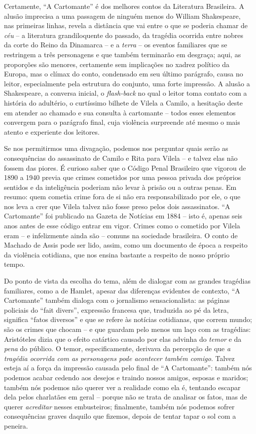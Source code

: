 \documentclass{extarticle}
\begin{document}
Certamente, ``A Cartomante'' é dos melhores contos da Literatura
Brasileira. A alusão imprecisa a uma passagem de ninguém menos do
William Shakespeare, nas primeiras linhas, revela a distância que vai
entre o que se poderia chamar de \emph{céu} -- a literatura
grandiloquente do passado, da tragédia ocorrida entre nobres da corte do
Reino da Dinamarca -- e a \emph{terra} -- os eventos familiares que se
restringem a três personagens e que também terminarão em desgraça; aqui,
as proporções são menores, certamente sem implicações no xadrez
político da Europa, mas o clímax do conto, condensado em seu último
parágrafo, causa no leitor, especialmente pela estrutura do conjunto,
uma forte impressão. A alusão a Shakespeare, a conversa inicial, o
\emph{flash-back} no qual o leitor toma contato com a história do
adultério, o curtíssimo bilhete de Vilela a Camilo, a hesitação deste em
atender ao chamado e sua consulta à cartomante -- todos esses elementos
convergem para o parágrafo final, cuja violência surpreende até mesmo o
mais atento e experiente dos leitores.

Se nos permitirmos uma divagação, podemos nos perguntar quais serão as
consequências do assassinato de Camilo e Rita para Vilela -- e talvez
elas não fossem das piores. É curioso saber que o Código Penal
Brasileiro que vigorou de 1890 a 1940 previa que crimes cometidos por
uma pessoa privada dos próprios sentidos e da inteligência poderiam não
levar à prisão ou a outras penas. Em resumo: quem cometia crime fora de
si não era responsabilizado por ele, o que nos leva a crer que Vilela
talvez não fosse preso pelos dois assassinatos. ``A Cartomante'' foi
publicado na Gazeta de Notícias em 1884 -- isto é, apenas seis anos
antes de esse código entrar em vigor. Crimes como o cometido por Vilela
eram -- e infelizmente ainda são -- comuns na sociedade brasileira. O
conto de Machado de Assis pode ser lido, assim, como um documento de
época a respeito da violência cotidiana, que nos ensina bastante a
respeito de nosso próprio tempo.

Do ponto de vista da escolha do tema, além de dialogar com as grandes
tragédias familiares, como a de Hamlet, apesar das diferenças evidentes
de contexto, ``A Cartomante'' também dialoga com o jornalismo
sensacionalista: as páginas policiais do ``fait divers'', expressão
francesa que, traduzida ao pé da letra, significa ``fatos diversos'' e
que se refere às notícias cotidianas, que correm mundo; são os crimes
que chocam -- e que guardam pelo menos um laço com as tragédias:
Aristóteles dizia que o efeito catártico causado por elas advinha do
\emph{temor} e da \emph{pena} do público. O temor, especificamente,
derivava da percepção de que \emph{a tragédia ocorrida com as
personagens pode acontecer também comigo}. Talvez esteja aí a força da
impressão causada pelo final de ``A Cartomante'': também nós podemos
acabar cedendo aos desejos e traindo nossos amigos, esposas e maridos;
também nós podemos não querer ver a realidade como ela é, tentando
escapar dela pelos charlatães em geral -- porque não se trata de
analisar os fatos, mas de querer \emph{acreditar} nesses embusteiros;
finalmente, também nós podemos sofrer consequências graves daquilo que
fizemos, depois de tentar tapar o sol com a peneira.
\end{document}
